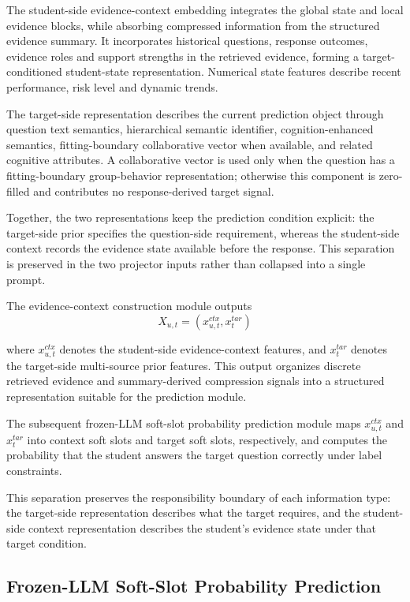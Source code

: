 \documentclass[a4paper,12pt]{article}
\numberwithin{table}{section}
\begin{document}
The student-side evidence-context embedding integrates the global state and local evidence blocks, while absorbing compressed information from the structured evidence summary. It incorporates historical questions, response outcomes, evidence roles and support strengths in the retrieved evidence, forming a target-conditioned student-state representation. Numerical state features describe recent performance, risk level and dynamic trends.

The target-side representation describes the current prediction object through question text semantics, hierarchical semantic identifier, cognition-enhanced semantics, fitting-boundary collaborative vector when available, and related cognitive attributes. A collaborative vector is used only when the question has a fitting-boundary group-behavior representation; otherwise this component is zero-filled and contributes no response-derived target signal.

Together, the two representations keep the prediction condition explicit: the target-side prior specifies the question-side requirement, whereas the student-side context records the evidence state available before the response. This separation is preserved in the two projector inputs rather than collapsed into a single prompt.

The evidence-context construction module outputs
\[
X_{u,t}=(x^{ctx}_{u,t},x^{tar}_{t})
\]

where \(x^{ctx}_{u,t}\) denotes the student-side evidence-context features, and \(x^{tar}_{t}\) denotes the target-side multi-source prior features. This output organizes discrete retrieved evidence and summary-derived compression signals into a structured representation suitable for the prediction module.

The subsequent frozen-LLM soft-slot probability prediction module maps \(x^{ctx}_{u,t}\) and \(x^{tar}_{t}\) into context soft slots and target soft slots, respectively, and computes the probability that the student answers the target question correctly under label constraints.

This separation preserves the responsibility boundary of each information type: the target-side representation describes what the target requires, and the student-side context representation describes the student's evidence state under that target condition.

\subsection{Frozen-LLM Soft-Slot Probability Prediction}
\end{document}
